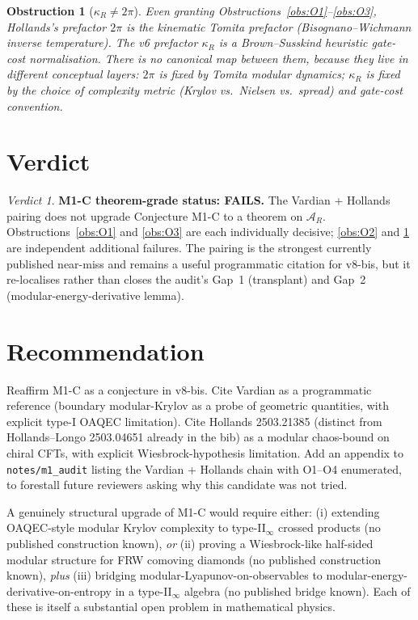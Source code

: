 \documentclass[11pt]{article}
\newtheorem{obstruction}[theorem]{Obstruction}
\theoremstyle{remark}
\newtheorem*{verdict}{Verdict}
\newcommand{\kR}{\kappa_{R}}
\newcommand{\AR}{\mathcal{A}_R}
\begin{document}
\begin{obstruction}[$\kR \ne 2\pi$]\label{obs:O4}
Even granting Obstructions~\ref{obs:O1}--\ref{obs:O3}, Hollands's prefactor
$2\pi$ is the kinematic Tomita prefactor (Bisognano--Wichmann inverse
temperature). The v6 prefactor $\kR$ is a Brown--Susskind heuristic
gate-cost normalisation. There is no canonical map between them, because
they live in different conceptual layers: $2\pi$ is fixed by Tomita
modular dynamics; $\kR$ is fixed by the choice of complexity metric
(Krylov vs.\ Nielsen vs.\ spread) and gate-cost convention.
\end{obstruction}

\section{Verdict}

\begin{verdict}
\textbf{M1-C theorem-grade status: FAILS.}
The Vardian + Hollands pairing does not upgrade Conjecture M1-C to a
theorem on $\AR$. Obstructions~\ref{obs:O1} and \ref{obs:O3} are each
individually decisive; \ref{obs:O2} and \ref{obs:O4} are independent
additional failures. The pairing is the strongest currently published
near-miss and remains a useful programmatic citation for v8-bis, but it
re-localises rather than closes the audit's Gap~1 (transplant) and
Gap~2 (modular-energy-derivative lemma).
\end{verdict}

\section{Recommendation}

Reaffirm M1-C as a conjecture in v8-bis. Cite Vardian as a programmatic
reference (boundary modular-Krylov as a probe of geometric quantities,
with explicit type-I OAQEC limitation). Cite Hollands 2503.21385
(distinct from Hollands--Longo 2503.04651 already in the bib) as a
modular chaos-bound on chiral CFTs, with explicit Wiesbrock-hypothesis
limitation. Add an appendix to \texttt{notes/m1\_audit} listing the
Vardian + Hollands chain with O1--O4 enumerated, to forestall future
reviewers asking why this candidate was not tried.

A genuinely structural upgrade of M1-C would require either:
(i) extending OAQEC-style modular Krylov complexity to type-II$_\infty$
crossed products (no published construction known), \emph{or}
(ii) proving a Wiesbrock-like half-sided modular structure for FRW
comoving diamonds (no published construction known), \emph{plus}
(iii) bridging modular-Lyapunov-on-observables to
modular-energy-derivative-on-entropy in a type-II$_\infty$ algebra (no
published bridge known). Each of these is itself a substantial open
problem in mathematical physics.
\end{document}

